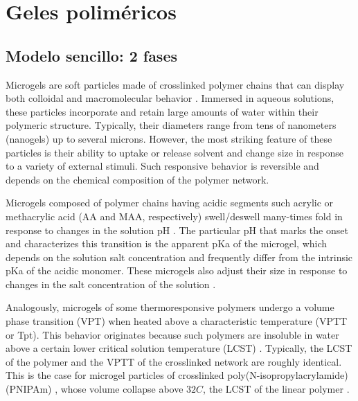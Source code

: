 
\chapter{Geles poliméricos} %

\label{Chapter3} %


\newcommand{\keyword}[1]{\textbf{#1}}
\newcommand{\tabhead}[1]{\textbf{#1}}
\newcommand{\code}[1]{\texttt{#1}}
\newcommand{\file}[1]{\texttt{\bfseries#1}}
\newcommand{\option}[1]{\texttt{\itshape#1}}


\section{Modelo sencillo: 2 fases}

Microgels are soft particles made of crosslinked polymer chains that can display both colloidal and macromolecular behavior .
Immersed in aqueous solutions, these particles incorporate and retain large amounts of water within their polymeric structure.
Typically, their diameters range from tens of nanometers (nanogels) up to several microns.
However, the most striking feature of these particles is their ability to uptake or release solvent and change size in response to a variety of external stimuli.
Such responsive behavior is reversible and depends on the chemical composition of the polymer network.


Microgels composed of polymer chains having acidic segments such acrylic or methacrylic acid (AA and MAA, respectively) swell/deswell many-times fold in response to changes in the solution pH .
The particular pH that marks the onset and characterizes this transition is the apparent pKa of the microgel, which depends on the solution salt concentration and frequently differ from the intrinsic pKa of the acidic monomer.
These microgels also adjust their size in response to changes in the salt concentration of the solution \addcite[snowden1996].




Analogously, microgels of some thermoresponsive polymers undergo a volume phase transition (VPT) when heated above a characteristic temperature (VPTT or Tpt).
This behavior originates because such polymers are insoluble in water above a certain lower critical solution temperature (LCST) \addcite[Kawaguch2020].
Typically, the LCST of the polymer and the VPTT of the crosslinked network are roughly identical.
This is the case for microgel particles of crosslinked poly(N-isopropylacrylamide) (PNIPAm) \addcite[Pelton1986], whose volume collapse above $32 C$, the LCST of the linear polymer \addcite[Schild1992].

